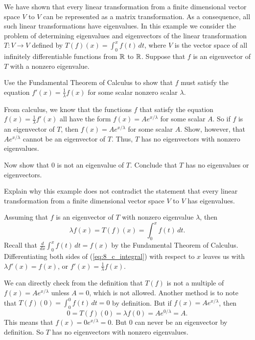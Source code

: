 \begin{example} We have shown that every linear transformation from a finite dimensional vector space $V$ to $V$ can be represented as a matrix transformation. As a consequence, all such linear transformations have eigenvalues. In this example we consider the problem of determining eigenvalues and eigenvectors of the linear transformation $T : V \to V$ defined by $T(f)(x) = \int_0^x f(t) \, dt$, where $V$ is the vector space of all infinitely differentiable functions from $\mathbb{R}$ to $\mathbb{R}$. Suppose that $f$ is an eigenvector of $T$ with a nonzero eigenvalue. 
\ba
\item Use the Fundamental Theorem of Calculus to show that $f$ must satisfy the equation $f'(x) = \frac{1}{\lambda} f(x)$ for some scalar nonzero scalar $\lambda$.  

\item From calculus, we know that the functions $f$ that satisfy the equation $f(x) = \frac{1}{\lambda} f'(x)$ all have the form $f(x) = Ae^{x/\lambda}$ for some scalar $A$. So if $f$ is an eigenvector of $T$, then $f(x) = Ae^{x/\lambda}$ for some scalar $A$.  Show, however, that $Ae^{x/\lambda}$ cannot be an eigenvector of $T$. Thus, $T$ has no eigenvectors with nonzero eigenvalues. 

\item Now show that $0$ is not an eigenvalue of $T$. Conclude that $T$ has no eigenvalues or eigenvectors. 

\item Explain why this example does not contradict the statement that every linear transformation from a finite dimensional vector space $V$ to $V$ has eigenvalues. 

\ea

\ExampleSolution

\end{example}

\ba
\item Assuming that $f$ is an eigenvector of $T$ with nonzero eigenvalue $\lambda$, then 
\begin{equation} \label{eq:8_c_integral}
\lambda f(x) = T(f)(x) = \int_0^x f(t) \, dt.
\end{equation}
Recall that $\frac{d}{dx}  \int_0^x f(t) \, dt = f(x)$ by the Fundamental Theorem of Calculus. Differentiating both sides of (\ref{eq:8_c_integral}) with respect to $x$ leaves us with $\lambda f'(x) = f(x)$, or $f'(x) = \frac{1}{\lambda} f(x)$.

\item We can directly check from the definition that $T(f)$ is not a multiple of $f(x)=Ae^{x/\lambda}$ unless $A=0$, which is not allowed. Another method is to note that $T(f)(0) = \int_0^0 f(t) \, dt = 0$ by definition. But if $f(x) = Ae^{x/\lambda}$, then 
\[0 = T(f)(0) = \lambda f(0) = Ae^{0/\lambda} = A.\]
This means that  $f(x) = 0e^{x/\lambda} = 0$. But $0$ can never be an eigenvector by definition. So $T$ has no eigenvectors with nonzero eigenvalues. 

